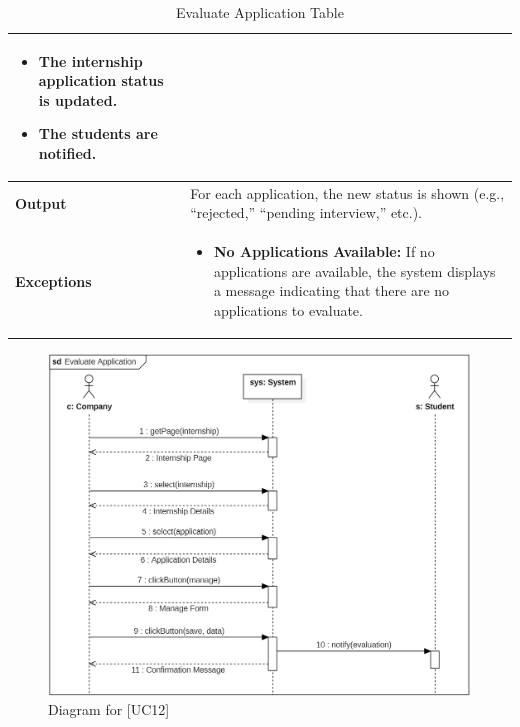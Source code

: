 \begin{table}[H]
\begin{tabular}{|p{4cm}|p{11cm}|}
{    \begin{itemize}
        \item The internship application status is updated.
        \item The students are notified.
    \end{itemize}} \\ \hline
    \textbf{Output} & 
    For each application, the new status is shown (e.g., “rejected,” “pending interview,” etc.). \\ \hline
    \textbf{Exceptions} & 
    {\setlength{\leftmargini}{1.1em}
    \begin{itemize}
        \item \textbf{No Applications Available:} If no applications are available, the system displays a message indicating that there are no applications to evaluate.
    \end{itemize}} \\ \hline
    \end{tabular}
    \caption{Evaluate Application Table}
\end{table}

\begin{figure} [H]
    \centering
    \includegraphics[width=1\linewidth]{Use Cases Images/evaluate application.png}
    \caption{Diagram for [UC12]}
    \label{fig: Evaluate Application Diagram}
\end{figure}

